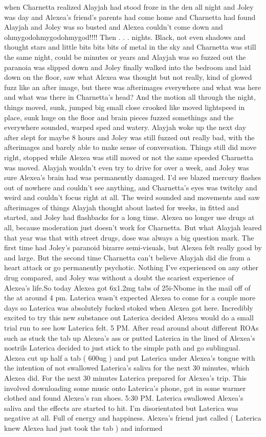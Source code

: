 \documentclass[12pt]{book}
\begin{document}
when Charnetta realized Alayjah had stood froze in the den all night and Joley was day and Alexea's friend's parents had come home and Charnetta had found Alayjah and Joley was so busted and Alexea couldn't come down and ohmygodohmygodohmygod!!!! Then . . .  nights. Black, not even shadows and thought stars and little bits bits bits of metal in the sky and Charnetta was still the same night, could be minutes or years and Alayjah was so fuzzed out the paranoia was slipped down and Joley finally walked into the bedroom and laid down on the floor, saw what Alexea was thought but not really, kind of glowed fuzz like an after image, but there was afterimages everywhere and what was here and what was there in Charnetta's head? And the motion all through the night, things moved, sunk, jumped big small close crooked like moved lightspeed in place, sunk huge on the floor and brain pieces fuzzed somethings and the everywhere sounded, warped sped and watery. Alayjah woke up the next day after slept for maybe 8 hours and Joley was still fuzzed out really bad, with the afterimages and barely able to make sense of conversation. Things still did move right, stopped while Alexea was still moved or not the same speeded Charnetta was moved. Alayjah wouldn't even try to drive for over a week, and Joley was sure Alexea's brain had was permanently damaged. I'd see blazed mercury flashes out of nowhere and couldn't see anything, and Charnetta's eyes was twitchy and weird and couldn't focus right at all. The weird sounded and movements and saw afterimages of things Alayjah thought about lasted for weeks, in fitted and started, and Joley had flashbacks for a long time. Alexea no longer use drugs at all, because moderation just doesn't work for Charnetta. But what Alayjah leared that year was that with street drugs, dose was always a big question mark. The first time had Joley's paranoid bizarre semi-visuals, but Alexea felt really good by and large. But the second time Charnetta can't believe Alayjah did die from a heart attack or go permanently psychotic. Nothing I've experienced on any other drug compared, and Joley was without a doubt the scariest experience of Alexea's life.So today Alexea got 6x1.2mg tabs of 25i-Nbome in the mail off of the at around 4 pm. Laterica wasn't expected Alexea to come for a couple more days so Laterica was absolutely fucked stoked when Alexea got here. Incredibly excited to try this new substance out Laterica decided Alexea would do a small trial run to see how Laterica felt. 5 PM. After read around about different ROAs such as stuck the tab up Alexea's ass or putted Laterica in the lined of Alexea's nostrils Laterica decided to just stick to the simple path and go sublingual. Alexea cut up half a tab ( 600ug ) and put Laterica under Alexea's tongue with the intention of not swallowed Laterica's saliva for the next 30 minutes, which Alexea did. For the next 30 minutes Laterica prepared for Alexea's trip. This involved downloading some music onto Laterica's phone, got in some warmer clothed and found Alexea's ran shoes. 5:30 PM. Laterica swallowed Alexea's saliva and the effects are started to hit. I'm disorientated but Laterica was negative at all. Full of energy and happiness. Alexea's friend just called ( Laterica knew Alexea had just took the tab ) and informed 
\end{document}
